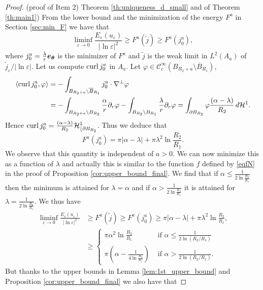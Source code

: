 \documentclass[12pt,reqno]{amsart}
\def\C{{\mathcal C}}
\def\e {{\varepsilon}}
\renewcommand{\vec}[1]{\text{\boldmath $#1$}}
\def\curl{{\rm curl\,}}
\def \p {\partial}
\numberwithin{equation}{section}
\begin{document}
\begin{proof}(proof of Item 2) Theorem \ref{th:uniqueness_d_small} and of Theorem  \ref{th:main1})
From the lower bound and the minimization of the energy \(F^a\) in Section \ref{sec:min_F} we have that
\begin{equation*}
\liminf_{\e \to 0} \frac{E_\e(u_\e)}{|\ln \e|^2} \geq  F^a(\tilde{j}) \geq F^a(j_0^a),
\end{equation*}
where \(j_0^a=\frac{\lambda}{r}\vec{e_\theta}\) is the minimizer of \(F^a\) and \(\tilde{j}\) is the weak limit in \(L^2(A_a)\) of \(\tilde{j}_\e/|\ln \e|\). Let us compute \(\curl j_0^a\) in \(A_a\). Let \(\varphi \in \C^\infty_c(B_{R_2+a}\setminus \overline{B}_{R_1})\),
\begin{align}
\langle \curl j_0^a, \varphi \rangle &= -\int_{B_{R_2+a}\setminus \overline{B}_{R_1}} j_0^a\cdot \nabla^\perp \varphi \nonumber \\
&=-\int_{B_{R_2+a}\setminus B_{R_2}}\frac{\alpha}{r}\p_r \varphi -\int_{B_{R_2}\setminus B_{R_1}} \frac{\lambda}{r}\p_r\varphi 
=\int_{\p B_{R_2}} \varphi \frac{(\alpha-\lambda)}{R_2} \, d \mathcal{H}^1. \label{eq:calcul_curl}
\end{align}
Hence \(\curl j_0^a=\frac{(\alpha-\lambda)}{R_2} \mathcal{H}^1_{\lfloor \p B_{R_2}}\). Thus we deduce that
\[F^a(j_0^a)=\pi |\alpha-\lambda|+\pi \lambda^2 \ln \frac{R_2}{R_1}.\]
We observe that this quantity is independent of \(a>0\). We can now minimize this as a function of \(\lambda\) and actually this is similar to the function $f$ defined by \eqref{eqfN} in the proof of Proposition \ref{cor:upper_bound_final}. We find that if \(\alpha \leq \frac{1}{2\ln \frac{R_2}{R_1}}\) then the minimum is attained for \(\lambda=\alpha\) and if \(\alpha > \frac{1}{2\ln \frac{R_2}{R_1}}\) it is attained for \( \lambda=\frac{1}{2\ln \frac{R_2}{R_1}}\). We thus have
\begin{align*}
\liminf_{\e \to 0} \frac{E_\e(u_\e)}{|\ln \e|^2}& \geq  F^a(\tilde{j}) \geq F^a(j_0^a) \geq \pi |\alpha-\lambda|+\pi \lambda^2 \ln \frac{R_2}{R_1},\\
& \geq \begin{cases}
\pi \alpha^2 \ln \frac{R_2}{R_1}  & \text{ if } \alpha \leq \frac{1}{2 \ln (R_2/R_1)} \\
 \pi \left(\alpha-\frac{1}{4\ln \frac{R_2}{R_1}}\right) & \text{ if } \alpha > \frac{1}{2 \ln (R_2/R_1)}.
\end{cases}  
\end{align*}
But thanks to the upper bounds in Lemma \ref{lem:1st_upper_bound} and Proposition \ref{cor:upper_bound_final} we also have that 

\end{proof}
\end{document}
